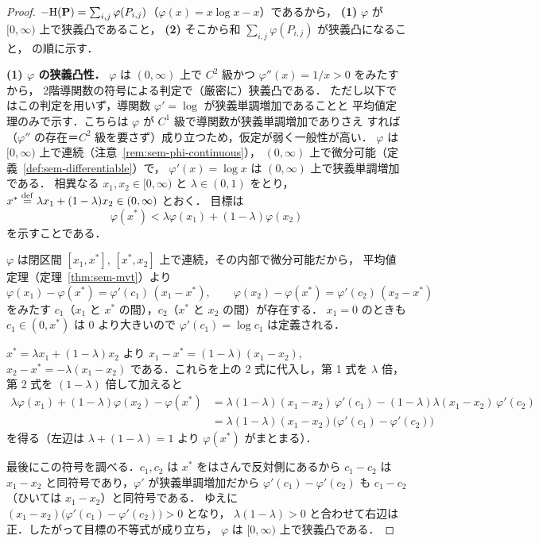 \begin{proof}
  $-\mathrm{H}(\mathbf{P}) = \sum_{i,j}\varphi(P_{i,j})$（$\varphi(x) = x\log x - x$）であるから，
  \textbf{(1)} $\varphi$ が $[0,\infty)$ 上で狭義凸であること，
  \textbf{(2)} そこから和 $\sum_{i,j}\varphi(P_{i,j})$ が狭義凸になること，
  の順に示す．

  \textbf{(1) $\varphi$ の狭義凸性．}
  $\varphi$ は $(0,\infty)$ 上で $C^2$ 級かつ $\varphi''(x) = 1/x > 0$ をみたすから，
  2階導関数の符号による判定で（厳密に）狭義凸である．
  ただし以下ではこの判定を用いず，導関数 $\varphi' = \log$ が狭義単調増加であることと
  平均値定理のみで示す．こちらは $\varphi$ が $C^1$ 級で導関数が狭義単調増加でありさえ
  すれば（$\varphi''$ の存在＝$C^2$ 級を要さず）成り立つため，仮定が弱く一般性が高い．
  $\varphi$ は $[0,\infty)$ 上で連続（注意~\ref{rem:sem-phi-continuous}），
  $(0,\infty)$ 上で微分可能（定義~\ref{def:sem-differentiable}）で，
  $\varphi'(x) = \log x$ は $(0,\infty)$ 上で狭義単調増加である．
  相異なる $x_1, x_2 \in [0,\infty)$ と $\lambda \in (0,1)$ をとり，
  $x^* \overset{\mathrm{def}}{=} \lambda x_1 + (1-\lambda)x_2 \in (0,\infty)$ とおく．
  目標は
  \[
    \varphi(x^*) < \lambda\varphi(x_1) + (1-\lambda)\varphi(x_2)
  \]
  を示すことである．

  $\varphi$ は閉区間 $[x_1, x^*]$, $[x^*, x_2]$ 上で連続，その内部で微分可能だから，
  平均値定理（定理~\ref{thm:sem-mvt}）より
  \[
    \varphi(x_1) - \varphi(x^*) = \varphi'(c_1)\,(x_1 - x^*),
    \qquad
    \varphi(x_2) - \varphi(x^*) = \varphi'(c_2)\,(x_2 - x^*)
  \]
  をみたす $c_1$（$x_1$ と $x^*$ の間），$c_2$（$x^*$ と $x_2$ の間）が存在する．
  $x_1 = 0$ のときも $c_1 \in (0, x^*)$ は $0$ より大きいので $\varphi'(c_1) = \log c_1$ は定義される．

  $x^* = \lambda x_1 + (1-\lambda)x_2$ より
  $x_1 - x^* = (1-\lambda)(x_1 - x_2)$,
  $x_2 - x^* = -\lambda(x_1 - x_2)$
  である．これらを上の 2 式に代入し，第 1 式を $\lambda$ 倍，第 2 式を $(1-\lambda)$ 倍して加えると
  \begin{align*}
    \lambda\varphi(x_1) + (1-\lambda)\varphi(x_2) - \varphi(x^*)
    &= \lambda(1-\lambda)(x_1 - x_2)\,\varphi'(c_1)
       - (1-\lambda)\lambda(x_1 - x_2)\,\varphi'(c_2) \\
    &= \lambda(1-\lambda)(x_1 - x_2)\bigl(\varphi'(c_1) - \varphi'(c_2)\bigr)
  \end{align*}
  を得る（左辺は $\lambda + (1-\lambda) = 1$ より $\varphi(x^*)$ がまとまる）．

  最後にこの符号を調べる．$c_1, c_2$ は $x^*$ をはさんで反対側にあるから
  $c_1 - c_2$ は $x_1 - x_2$ と同符号であり，$\varphi'$ が狭義単調増加だから
  $\varphi'(c_1) - \varphi'(c_2)$ も $c_1 - c_2$（ひいては $x_1 - x_2$）と同符号である．
  ゆえに $(x_1 - x_2)\bigl(\varphi'(c_1) - \varphi'(c_2)\bigr) > 0$ となり，
  $\lambda(1-\lambda) > 0$ と合わせて右辺は正．したがって目標の不等式が成り立ち，
  $\varphi$ は $[0,\infty)$ 上で狭義凸である．


\end{proof}
